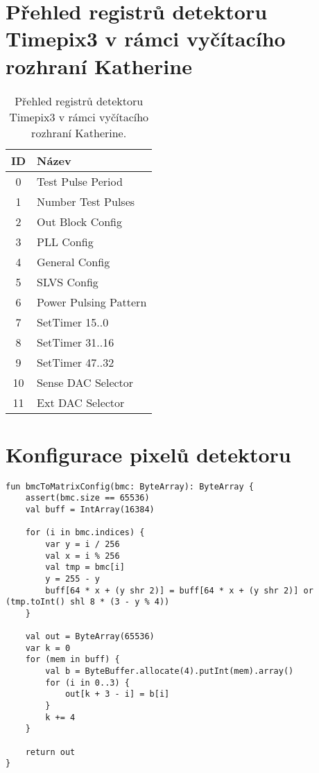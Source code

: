 \section{Přehled registrů detektoru Timepix3 v rámci vyčítacího rozhraní Katherine}\label{chap:app:katherine:tpx3_registers}
\begin{table}[h!]
	\begin{center}
		\begin{tabular}{|c|l|}
			\hline
            \textbf{ID} & \textbf{Název} \\
			\hline
            0 & Test Pulse Period \\
            1 & Number Test Pulses \\
            2 & Out Block Config \\
            3 & PLL Config \\
            4 & General Config \\
            5 & SLVS Config \\
            6 & Power Pulsing Pattern \\
            7 & SetTimer 15..0 \\
            8 & SetTimer 31..16 \\
            9 & SetTimer 47..32 \\
            10 & Sense DAC Selector \\
            11 & Ext DAC Selector \\
			\hline
		\end{tabular}
	\end{center}
	\caption{Přehled registrů detektoru Timepix3 v rámci vyčítacího rozhraní Katherine.}
\end{table}

\section{Konfigurace pixelů detektoru}\label{chap:app:katherine:pix_config}
\begin{code}[h!]
\begin{verbatim}
fun bmcToMatrixConfig(bmc: ByteArray): ByteArray {
    assert(bmc.size == 65536)
    val buff = IntArray(16384)

    for (i in bmc.indices) {
        var y = i / 256
        val x = i % 256
        val tmp = bmc[i]
        y = 255 - y
        buff[64 * x + (y shr 2)] = buff[64 * x + (y shr 2)] or (tmp.toInt() shl 8 * (3 - y % 4))
    }

    val out = ByteArray(65536)
    var k = 0
    for (mem in buff) {
        val b = ByteBuffer.allocate(4).putInt(mem).array()
        for (i in 0..3) {
            out[k + 3 - i] = b[i]
        }
        k += 4
    }

    return out
}
\end{verbatim}
\caption{Ukázka kódu pro převod pixelové konfigurace detektoru z formátu \texttt{BMC} do formátu podporovaného vyčítacím rozhraním \textit{Katherine}.}
\end{code}

